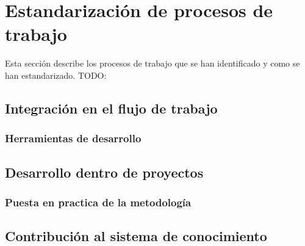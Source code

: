 \section{Estandarización de procesos de trabajo}
Esta sección describe los procesos de trabajo que se
han identificado y como se han estandarizado. TODO:

\subsection{Integración en el flujo de trabajo}
\subsubsection{Herramientas de desarrollo}
\subsection{Desarrollo dentro de proyectos}
\subsubsection{Puesta en practica de la metodología}
\subsection{Contribución al sistema de conocimiento}

\pagebreak
